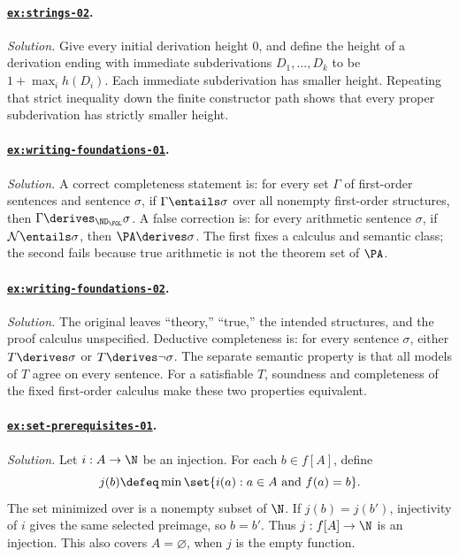 \paragraph{\hyperref[ex:strings-02]{\texttt{ex:strings-02}}.}
\textit{Solution.}  Give every initial derivation height \(0\), and define the
height of a derivation ending with immediate subderivations
\(D_1,\ldots,D_k\) to be \(1+\max_i h(D_i)\).  Each immediate subderivation
has smaller height.  Repeating that strict inequality down the finite
constructor path shows that every proper subderivation has strictly smaller
height.

\paragraph{\hyperref[ex:writing-foundations-01]{\texttt{ex:writing-foundations-01}}.}
\textit{Solution.}  A correct completeness statement is: for every set
\(\Gamma\) of first-order sentences and sentence \(\sigma\), if
\(\Gamma\entails\sigma\) over all nonempty first-order structures, then
\(\Gamma\derives_{\ND_{\FOL}}\sigma\).  A false correction is: for every
arithmetic sentence \(\sigma\), if \(\mathcal N\entails\sigma\), then
\(\PA\derives\sigma\).  The first fixes a calculus and semantic class; the
second fails because true arithmetic is not the theorem set of \(\PA\).

\paragraph{\hyperref[ex:writing-foundations-02]{\texttt{ex:writing-foundations-02}}.}
\textit{Solution.}  The original leaves ``theory,'' ``true,'' the intended
structures, and the proof calculus unspecified.  Deductive completeness is:
for every sentence \(\sigma\), either \(T\derives\sigma\) or
\(T\derives\neg\sigma\).  The separate semantic property is that all models of
\(T\) agree on every sentence.  For a satisfiable \(T\), soundness and
completeness of the fixed first-order calculus make these two properties
equivalent.

\paragraph{\hyperref[ex:set-prerequisites-01]{\texttt{ex:set-prerequisites-01}}.}
\textit{Solution.}  Let \(i:A\to\N\) be an injection.  For each
\(b\in f[A]\), define
\[
  j(b)\defeq\min\set{i(a):a\in A\text{ and }f(a)=b}.
\]
The set minimized over is a nonempty subset of \(\N\).  If
\(j(b)=j(b')\), injectivity of \(i\) gives the same selected preimage, so
\(b=b'\).  Thus \(j:f[A]\to\N\) is an injection.  This also covers
\(A=\varnothing\), when \(j\) is the empty function.


